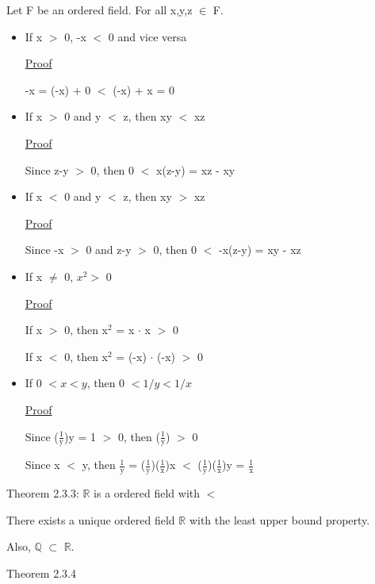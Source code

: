 \qquad Let F be an ordered field. For all x,y,z $\in$ F.
\begin{itemize}[leftmargin=2cm]
	\item If x $>$ 0, -x $<$ 0 and vice versa
	
		{ \color{magenta} \underline{Proof} } 
	
		-x = (-x) + 0 $<$ (-x) + x = 0

	\item If x $>$ 0 and y $<$ z, then xy $<$ xz
	
		{ \color{magenta} \underline{Proof} } 
		
		Since z-y $>$ 0, then 0 $<$ x(z-y) = xz - xy

	\item If x $ < $ 0 and y $ < $ z, then xy $ > $ xz

		{ \color{magenta} \underline{Proof} } 
		
		Since -x $>$ 0 and z-y $>$ 0, then 0 $<$ -x(z-y) = xy - xz
	
	\item If x $\neq$ 0, $x^2 > $ 0

		{ \color{magenta} \underline{Proof} } 
		
		If x $>$ 0, then x$^\text{2}$ = x $\cdot$ x $>$ 0

		If x $<$ 0, then x$^\text{2}$ = (-x) $\cdot$ (-x) $>$ 0
	
	\item If 0 $< x < y$, then 0 $< 1/y < 1/x$

		{ \color{magenta} \underline{Proof} } 
		
		Since ($\frac{1}{\text{y}}$)y = 1 $>$ 0, then ($\frac{1}{\text{y}}$) $>$ 0

		Since x $<$ y, then $\frac{1}{\text{y}}$ = ($\frac{1}{\text{y}}$)($\frac{1}{\text{x}}$)x
		$<$ ($\frac{1}{\text{y}}$)($\frac{1}{\text{x}}$)y = $\frac{1}{\text{x}}$ 
\end{itemize}

{\color{red} Theorem 2.3.3: $\mathbb{R}$ is a ordered field with $<$ }

\qquad There exists a unique ordered field $ \mathbb{R} $ with the least upper bound property.

\qquad Also, $ \mathbb{Q} $  $\subset$ $ \mathbb{R} $. \\

\newpage

{\color{red} Theorem 2.3.4}

